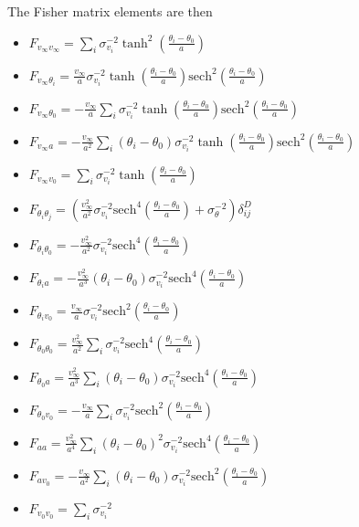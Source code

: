 \documentclass[11pt, oneside]{article}   	%
\begin{document}
The Fisher matrix elements are then
\begin{itemize}
\item $F_{v_\infty v_\infty} = \sum_i \sigma_{v_i}^{-2}  \tanh^2{\left(\frac{\theta_i - \theta_0}{a}\right)} $
\item $F_{v_\infty \theta_i}  = \frac{v_\infty }{a} \sigma_{v_i}^{-2} \tanh{\left(\frac{\theta_i - \theta_0}{a}\right)} \text{sech}^2{\left(\frac{\theta_i - \theta_0}{a}\right)}  $ 
\item $F_{v_\infty \theta_0}  =  -\frac{v_\infty }{a} \sum_i  \sigma_{v_i}^{-2}  \tanh{\left(\frac{\theta_i - \theta_0}{a}\right)} \text{sech}^2{\left(\frac{\theta_i - \theta_0}{a}\right)} $ 
\item $F_{v_\infty a}  =  -\frac{v_\infty }{a^2} \sum_i  (\theta_i - \theta_0) \sigma_{v_i}^{-2}  \tanh{\left(\frac{\theta_i - \theta_0}{a}\right)} \text{sech}^2{\left(\frac{\theta_i - \theta_0}{a}\right)} $ 
\item $F_{v_\infty v_0} = \sum_i \sigma_{v_i}^{-2}  \tanh{\left(\frac{\theta_i - \theta_0}{a}\right)} $
\item $F_{\theta_i \theta_j}  = ( \frac{v_\infty^2 }{a^2}  \sigma_{v_i}^{-2}\text{sech}^4{\left(\frac{\theta_i - \theta_0}{a}\right)} + \sigma_\theta^{-2}) \delta^D_{ij}$ 
\item $F_{\theta_i \theta_0}  =  - \frac{v_\infty^2}{a^2}  \sigma_{v_i}^{-2}\text{sech}^4{\left(\frac{\theta_i - \theta_0}{a}\right)} $ 
\item $F_{\theta_i a}  =  - \frac{v_\infty^2}{a^3}   (\theta_i - \theta_0) \sigma_{v_i}^{-2}\text{sech}^4{\left(\frac{\theta_i - \theta_0}{a}\right)} $ \item $F_{\theta_i v_0}  =   \frac{v_\infty}{a} \sigma_{v_i}^{-2}\text{sech}^2{\left(\frac{\theta_i - \theta_0}{a}\right)} $ 
\item $F_{\theta_0 \theta_0}  =   \frac{v_\infty^2}{a^2} \sum_i \sigma_{v_i}^{-2}\text{sech}^4{\left(\frac{\theta_i - \theta_0}{a}\right)} $ 
\item $F_{\theta_0 a}  =   \frac{v_\infty^2}{a^3} \sum_i  (\theta_i - \theta_0)  \sigma_{v_i}^{-2}\text{sech}^4{\left(\frac{\theta_i - \theta_0}{a}\right)} $
\item $F_{\theta_0 v_0}  =  -  \frac{v_\infty}{a} \sum_i \sigma_{v_i}^{-2}\text{sech}^2{\left(\frac{\theta_i - \theta_0}{a}\right)} $  
\item $F_{a a}  =   \frac{v_\infty^2}{a^4} \sum_i  (\theta_i - \theta_0)^2  \sigma_{v_i}^{-2}\text{sech}^4{\left(\frac{\theta_i - \theta_0}{a}\right)} $ 
\item $F_{a v_0}  =  - \frac{v_\infty}{a^2} \sum_i  (\theta_i - \theta_0)  \sigma_{v_i}^{-2}\text{sech}^2{\left(\frac{\theta_i - \theta_0}{a}\right)} $ 
\item $F_{v_0 v_0}  =  \sum_i   \sigma_{v_i}^{-2} $ 
\end{itemize}
\end{document}
